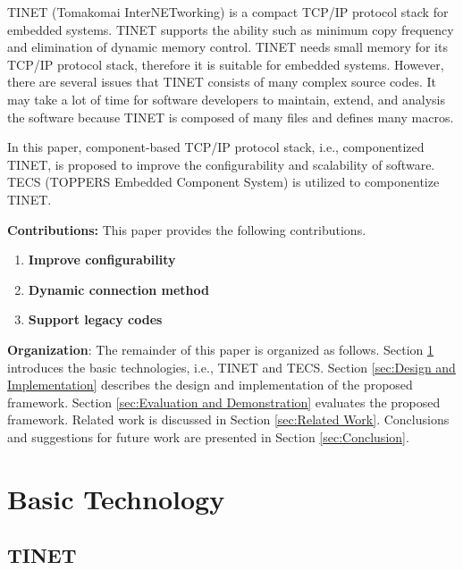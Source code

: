 \documentclass[conference]{IEEEtran/IEEEtran}
\begin{document}
TINET (Tomakomai InterNETworking) \cite{url:TINET} is a compact TCP/IP protocol stack for embedded systems.
TINET supports the ability such as minimum copy frequency and elimination of dynamic memory control.
TINET needs small memory for its TCP/IP protocol stack, therefore it is suitable for embedded systems.
However, there are several issues that TINET consists of many complex source codes.
It may take a lot of time for software developers to maintain, extend, and analysis the software because TINET is composed of many files and defines many macros.

In this paper, component-based TCP/IP protocol stack, i.e., componentized TINET, is proposed to improve the configurability and scalability of software.
TECS (TOPPERS Embedded Component System) \cite{par:TECS} is utilized to componentize TINET.


{\bf Contributions:} This paper provides the following contributions.

\begin{enumerate}

    \item {\bf Improve configurability}

    \item {\bf Dynamic connection method}

    \item {\bf Support legacy codes}


\end{enumerate}

{\bf Organization}: The remainder of this paper is organized as follows.
Section \ref{sec:Basic Technology} introduces the basic technologies, i.e., TINET and TECS.
Section \ref{sec:Design and Implementation} describes the design and implementation of the proposed framework.
Section \ref{sec:Evaluation and Demonstration} evaluates the proposed framework.
Related work is discussed in Section \ref{sec:Related Work}.
Conclusions and suggestions for future work are presented in Section \ref{sec:Conclusion}.




\section{Basic Technology}
\label{sec:Basic Technology}

\subsection{TINET}
\end{document}
